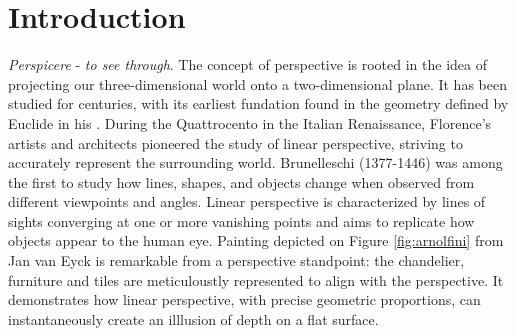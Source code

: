 \chapter{Introduction}
\label{chapter:introduction}

{}


\emph{Perspicere} - \textit{to see through}. The concept of perspective is rooted in the idea of projecting our three-dimensional world onto a two-dimensional plane. It has been studied for centuries, with its earliest fundation found in the geometry defined by Euclide in his \cite{euclide}. During the Quattrocento in the Italian Renaissance, Florence's artists and architects pioneered the study of linear perspective, striving to accurately represent the surrounding world. Brunelleschi (1377-1446) was among the first to study how lines, shapes, and objects change when observed from different viewpoints and angles. Linear perspective is characterized by lines of sights converging at one or more vanishing points and aims to replicate how objects appear to the human eye. Painting depicted on Figure \ref{fig:arnolfini} from Jan van Eyck is remarkable from a perspective standpoint: the chandelier, furniture and tiles are meticuloustly represented to align with the perspective. It demonstrates how linear perspective, with precise geometric proportions, can instantaneously create an illlusion of depth on a flat surface. 

